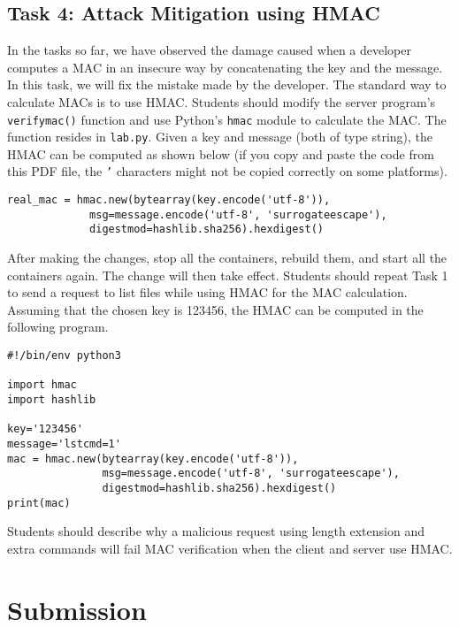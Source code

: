 \subsection{Task 4: Attack Mitigation using HMAC}

In the tasks so far, we have observed the damage caused when a developer
computes a MAC in an insecure way by concatenating the key and the message.
In this task, we will fix the mistake made by the developer. The standard
way to calculate MACs is to use HMAC. Students
should modify the server program's \texttt{verify\textunderscore mac()}
function and use Python's \texttt{hmac} module to calculate the MAC. The
function resides in \texttt{lab.py}. Given a key and message (both of type
string), the HMAC can be computed as shown below (if you copy and paste 
the code from this PDF file, 
the \texttt{'} characters might not be copied correctly on some platforms).

\begin{lstlisting}
real_mac = hmac.new(bytearray(key.encode('utf-8')), 
             msg=message.encode('utf-8', 'surrogateescape'), 
             digestmod=hashlib.sha256).hexdigest()
\end{lstlisting}

After making the changes, stop all the containers, rebuild them,
and start all the containers again. The change will then take effect. 
Students should repeat Task 1 to send a request to list files while using HMAC for
the MAC calculation. Assuming that the chosen key is 123456, the HMAC can be computed
in the following program. 

\begin{lstlisting}
#!/bin/env python3

import hmac
import hashlib

key='123456'
message='lstcmd=1'
mac = hmac.new(bytearray(key.encode('utf-8')),
               msg=message.encode('utf-8', 'surrogateescape'),
               digestmod=hashlib.sha256).hexdigest()
print(mac)
\end{lstlisting}
 



Students should describe why a malicious request using length extension and
extra commands will fail MAC verification when the client and server use
HMAC.


\section{Submission}

